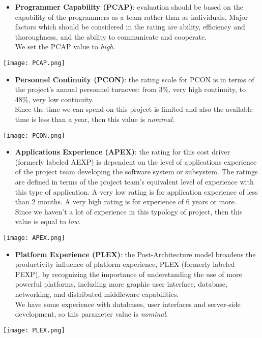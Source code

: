 \begin{itemize}
	\item \textbf{Programmer Capability (PCAP)}: evaluation should be based on the capability of the programmers as a team rather than as individuals. Major factors which should be considered in the rating are ability, efficiency and thoroughness, and the ability to communicate and cooperate. \\ We set the PCAP value to \textit{high}.
\end{itemize}
\begin{center}
	\texttt{[image: PCAP.png]}
\end{center}	

\begin{itemize}
	\item \textbf{Personnel Continuity (PCON)}: the rating scale for PCON is in terms of the project’s annual personnel turnover: from 3\%, very high continuity, to 48\%, very low continuity. \\ Since the time we can spend on this project is limited and also the available time is less than a year, then this value is \textit{nominal}.
\end{itemize}
\begin{center}
	\texttt{[image: PCON.png]}
\end{center}

\begin{itemize}
	\item \textbf{Applications Experience (APEX)}: the rating for this cost driver (formerly labeled AEXP) is dependent on the level of applications experience of the project team developing the software system or subsystem. The ratings are defined in terms of the project team's equivalent level of experience with this type of application. A very low rating is for application experience of less than 2 months. A very high rating is for experience of 6 years or more. \\ Since we haven't a lot of experience in this typology of project, then this value is equal to \textit{low}.
\end{itemize}
\begin{center}
	\texttt{[image: APEX.png]}
\end{center}

\begin{itemize}
	\item \textbf{Platform Experience (PLEX)}: the Post-Architecture model broadens the productivity influence of platform experience, PLEX (formerly labeled PEXP), by recognizing the importance of understanding the use of more powerful platforms, including more graphic user interface, database, networking, and distributed middleware capabilities. \\ We have some experience with databases, user interfaces and server-side development, so this parameter value is \textit{nominal}. 
\end{itemize}
\begin{center}
	\texttt{[image: PLEX.png]}
\end{center}

